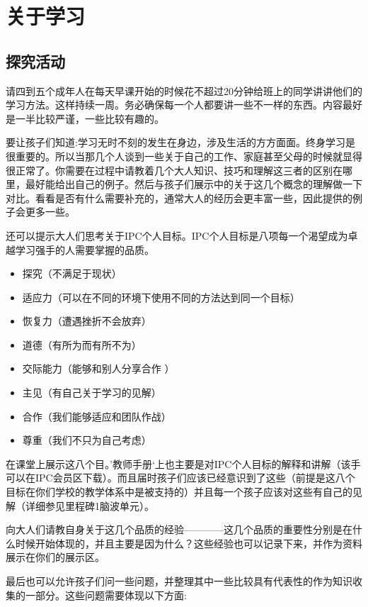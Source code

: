 \chapter{关于学习}
  
\section{探究活动}
    请四到五个成年人在每天早课开始的时候花不超过20分钟给班上的同学讲讲他们的学习方法。这样持续一周。务必确保每一个人都要讲一些不一样的东西。内容最好是一半比较严谨，一些比较有趣的。\par
    要让孩子们知道:学习无时不刻的发生在身边，涉及生活的方方面面。终身学习是很重要的。所以当那几个人谈到一些关于自己的工作、家庭甚至父母的时候就显得很正常了。你需要在过程中请教着几个大人知识、技巧和理解这三者的区别在哪里，最好能给出自己的例子。然后与孩子们展示中的关于这几个概念的理解做一下对比。看看是否有什么需要补充的，通常大人的经历会更丰富一些，因此提供的例子会更多一些。\par
    还可以提示大人们思考关于IPC个人目标。IPC个人目标是八项每一个渴望成为卓越学习强手的人需要掌握的品质。\par
    \begin{itemize}
      \item 探究（不满足于现状）
      \item 适应力（可以在不同的环境下使用不同的方法达到同一个目标）
      \item 恢复力（遭遇挫折不会放弃）
      \item 道德（有所为而有所不为）
      \item 交际能力（能够和别人分享合作 ）  
      \item 主见（有自己关于学习的见解）  
      \item 合作（我们能够适应和团队作战） 
      \item 尊重（我们不只为自己考虑）  
    \end{itemize}
    在课堂上展示这八个目。’教师手册‘上也主要是对IPC个人目标的解释和讲解（该手可以在IPC会员区下载）。而且届时孩子们应该已经意识到了这些（前提是这八个目标在你们学校的教学体系中是被支持的）并且每一个孩子应该对这些有自己的见解（详细参见里程碑1脑波单元）。\par
    向大人们请教自身关于这几个品质的经验————这几个品质的重要性分别是在什么时候开始体现的，并且主要是因为什么？这些经验也可以记录下来，并作为资料展示在你们的展示区。\par
    最后也可以允许孩子们问一些问题，并整理其中一些比较具有代表性的作为知识收集的一部分。这些问题需要体现以下方面:\par
